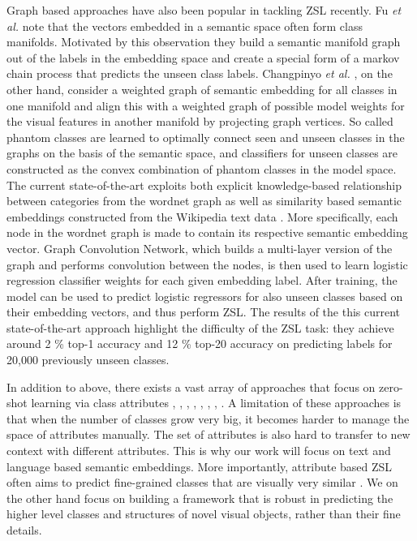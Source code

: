 \documentclass[12pt]{report}
\begin{document}
Graph based approaches have also been popular in tackling ZSL recently. Fu \textit{et al.} \cite{Fu2015a} note that the vectors embedded in a semantic space often form class manifolds. Motivated by this observation they build a semantic manifold graph out of the labels in the embedding space and create a special form of a markov chain process that predicts the unseen class labels. Changpinyo \textit{et al.} \cite{Changpinyo2016}, on the other hand, consider a weighted graph of semantic embedding for all classes in one manifold and align this with a weighted graph of possible model weights for the visual features in another manifold by projecting graph vertices. So called phantom classes are learned to optimally connect seen and unseen classes in the graphs on the basis of the semantic space, and classifiers for unseen classes are constructed as the convex combination of phantom classes in the model space. The current state-of-the-art \cite{Wang2018a} exploits both explicit knowledge-based relationship between categories from the wordnet graph as well as similarity based semantic embeddings constructed from the Wikipedia text data \cite{Pennington2014}. More specifically, each node in the wordnet graph is made to contain its respective semantic embedding vector. Graph Convolution Network, which builds a multi-layer version of the graph and performs convolution between the nodes, is then used to learn logistic regression classifier weights for each given embedding label. After training, the model can be used to predict logistic regressors for also unseen classes based on their embedding vectors, and thus perform ZSL. The results of the this current state-of-the-art approach highlight the difficulty of the ZSL task: they achieve around 2 \% top-1 accuracy and 12 \% top-20 accuracy on predicting labels for 20,000 previously unseen classes. 

In addition to above, there exists a vast array of approaches that focus on zero-shot learning via class attributes \cite{Farhadi2010}, \cite{Rohrbach2010}, \cite{Rohrbach2011}, \cite{Hwang2014}, \cite{Akata2016}, \cite{Xian2016}, \cite{Romera-Paredes2017}, \cite{Bucher2016}. A limitation of these approaches is that when the number of classes grow very big, it becomes harder to manage the space of attributes manually. The set of attributes is also hard to transfer to new context \cite{Ba2014} with different attributes. This is why our work will focus on text and language based semantic embeddings. More importantly, attribute based ZSL often aims to predict fine-grained classes that are visually very similar \cite{Xian2016} \cite{Reed2016}. We on the other hand focus on building a framework that is robust in predicting the higher level classes and structures of novel visual objects, rather than their fine details.
\end{document}
